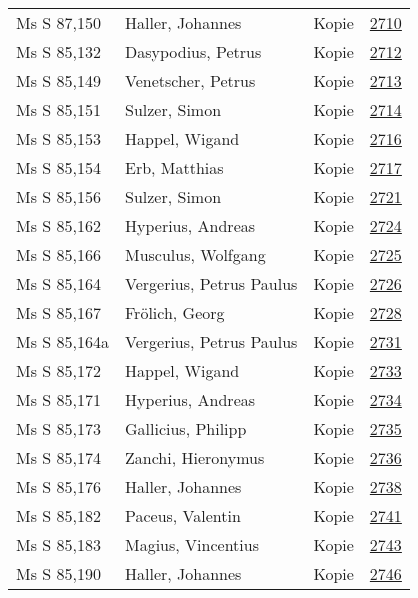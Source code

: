 \documentclass[10pt,a4paper,landscape]{report}
\begin{document}
\begin{longtable}{p{16cm}p{4cm}lr}
Ms S 87,150	&	Haller, Johannes	&	Kopie	&	\href{http://130.60.24.72/assignment/2710}{2710}\\
Ms S 85,132	&	Dasypodius, Petrus	&	Kopie	&	\href{http://130.60.24.72/assignment/2712}{2712}\\
Ms S 85,149	&	Venetscher, Petrus	&	Kopie	&	\href{http://130.60.24.72/assignment/2713}{2713}\\
Ms S 85,151	&	Sulzer, Simon	&	Kopie	&	\href{http://130.60.24.72/assignment/2714}{2714}\\
Ms S 85,153	&	Happel, Wigand	&	Kopie	&	\href{http://130.60.24.72/assignment/2716}{2716}\\
Ms S 85,154	&	Erb, Matthias	&	Kopie	&	\href{http://130.60.24.72/assignment/2717}{2717}\\
Ms S 85,156	&	Sulzer, Simon	&	Kopie	&	\href{http://130.60.24.72/assignment/2721}{2721}\\
Ms S 85,162	&	Hyperius, Andreas	&	Kopie	&	\href{http://130.60.24.72/assignment/2724}{2724}\\
Ms S 85,166	&	Musculus, Wolfgang	&	Kopie	&	\href{http://130.60.24.72/assignment/2725}{2725}\\
Ms S 85,164	&	Vergerius, Petrus Paulus	&	Kopie	&	\href{http://130.60.24.72/assignment/2726}{2726}\\
Ms S 85,167	&	Frölich, Georg	&	Kopie	&	\href{http://130.60.24.72/assignment/2728}{2728}\\
Ms S 85,164a	&	Vergerius, Petrus Paulus	&	Kopie	&	\href{http://130.60.24.72/assignment/2731}{2731}\\
Ms S 85,172	&	Happel, Wigand	&	Kopie	&	\href{http://130.60.24.72/assignment/2733}{2733}\\
Ms S 85,171	&	Hyperius, Andreas	&	Kopie	&	\href{http://130.60.24.72/assignment/2734}{2734}\\
Ms S 85,173	&	Gallicius, Philipp	&	Kopie	&	\href{http://130.60.24.72/assignment/2735}{2735}\\
Ms S 85,174	&	Zanchi, Hieronymus	&	Kopie	&	\href{http://130.60.24.72/assignment/2736}{2736}\\
Ms S 85,176	&	Haller, Johannes	&	Kopie	&	\href{http://130.60.24.72/assignment/2738}{2738}\\
Ms S 85,182	&	Paceus, Valentin	&	Kopie	&	\href{http://130.60.24.72/assignment/2741}{2741}\\
Ms S 85,183	&	Magius, Vincentius	&	Kopie	&	\href{http://130.60.24.72/assignment/2743}{2743}\\
Ms S 85,190	&	Haller, Johannes	&	Kopie	&	\href{http://130.60.24.72/assignment/2746}{2746}\\

\end{longtable}
\end{document}
